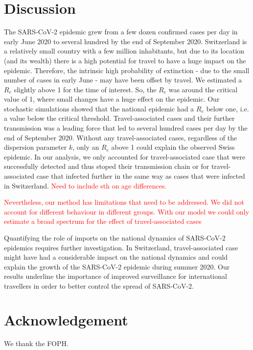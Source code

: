 \documentclass[10pt, a4paper, twoside]{article}
\begin{document}
\begin{multicols}{2}

\section{Discussion}
The SARS-CoV-2 epidemic grew from a few dozen confirmed cases per day in early June 2020 to several hundred by the end of September 2020. 
Switzerland is a relatively small country with a few million inhabitants, but due to its location (and its wealth) there is a high potential for travel to have a huge impact on the epidemic.
Therefore, the intrinsic high probability of extinction - due to the small number of cases in early June - may have been offset by travel.
We estimated a $R_e$ slightly above 1 for the time of interest. So, the $R_e$ was around the critical value of 1, where small changes have a huge effect on the epidemic. 
Our stochastic simulations showed that the national epidemic had a $R_e$ below one, i.e. a value below the critical threshold. 
Travel-associated cases and their further transmission was a leading force that led to several hundred cases per day by the end of September 2020. 
Without any travel-associated cases, regardless of the dispersion parameter $k$, only an $R_e$ above 1 could explain the observed Swiss epidemic. 
In our analysis, we only accounted for travel-associated case that were successfully detected and thus stoped their transmission chain or for travel-associated case that infected further in the same way as cases that were infected in Switzerland.
\textcolor{red}{Need to include sth on age differences.}


\textcolor{red}{Nevertheless, our method has limitations that need to be addressed. We did not account for different behaviour in different groups. With our model we could only estimate a broad spectrum for the effect of travel-associated cases}

Quantifying the role of imports on the national dynamics of SARS-CoV-2 epidemics requires further investigation. 
In Switzerland, travel-associated case might have had a considerable impact on the national dynamics and could explain the growth of the SARS-CoV-2 epidemic during summer 2020. 
Our results underline the importance of improved surveillance for international travellers in order to better control the spread of SARS-CoV-2.

\section{Acknowledgement}
We thank the FOPH.


\end{multicols}
\end{document}
